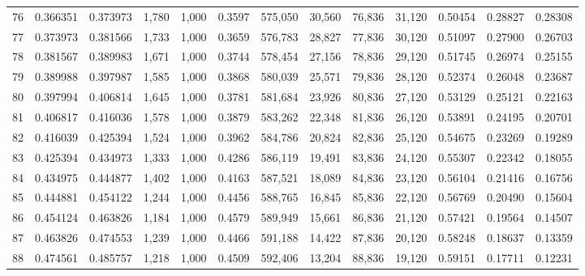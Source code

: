 \begin{tabular}{rrrrrrrrrrrrr}
76  &  0.366351 &  0.373973 &   1,780 &  1,000 &                                     0.3597 &  575,050 &   30,560 &   76,836 &   31,120 &  0.50454 &  0.28827 &  0.28308 \\
77  &  0.373973 &  0.381566 &   1,733 &  1,000 &                                     0.3659 &  576,783 &   28,827 &   77,836 &   30,120 &  0.51097 &  0.27900 &  0.26703 \\
78  &  0.381567 &  0.389983 &   1,671 &  1,000 &                                     0.3744 &  578,454 &   27,156 &   78,836 &   29,120 &  0.51745 &  0.26974 &  0.25155 \\
79  &  0.389988 &  0.397987 &   1,585 &  1,000 &                                     0.3868 &  580,039 &   25,571 &   79,836 &   28,120 &  0.52374 &  0.26048 &  0.23687 \\
80  &  0.397994 &  0.406814 &   1,645 &  1,000 &                                     0.3781 &  581,684 &   23,926 &   80,836 &   27,120 &  0.53129 &  0.25121 &  0.22163 \\
81  &  0.406817 &  0.416036 &   1,578 &  1,000 &                                     0.3879 &  583,262 &   22,348 &   81,836 &   26,120 &  0.53891 &  0.24195 &  0.20701 \\
82  &  0.416039 &  0.425394 &   1,524 &  1,000 &                                     0.3962 &  584,786 &   20,824 &   82,836 &   25,120 &  0.54675 &  0.23269 &  0.19289 \\
83  &  0.425394 &  0.434973 &   1,333 &  1,000 &                                     0.4286 &  586,119 &   19,491 &   83,836 &   24,120 &  0.55307 &  0.22342 &  0.18055 \\
84  &  0.434975 &  0.444877 &   1,402 &  1,000 &                                     0.4163 &  587,521 &   18,089 &   84,836 &   23,120 &  0.56104 &  0.21416 &  0.16756 \\
85  &  0.444881 &  0.454122 &   1,244 &  1,000 &                                     0.4456 &  588,765 &   16,845 &   85,836 &   22,120 &  0.56769 &  0.20490 &  0.15604 \\
86  &  0.454124 &  0.463826 &   1,184 &  1,000 &                                     0.4579 &  589,949 &   15,661 &   86,836 &   21,120 &  0.57421 &  0.19564 &  0.14507 \\
87  &  0.463826 &  0.474553 &   1,239 &  1,000 &                                     0.4466 &  591,188 &   14,422 &   87,836 &   20,120 &  0.58248 &  0.18637 &  0.13359 \\
88  &  0.474561 &  0.485757 &   1,218 &  1,000 &                                     0.4509 &  592,406 &   13,204 &   88,836 &   19,120 &  0.59151 &  0.17711 &  0.12231 \\

\end{tabular}
